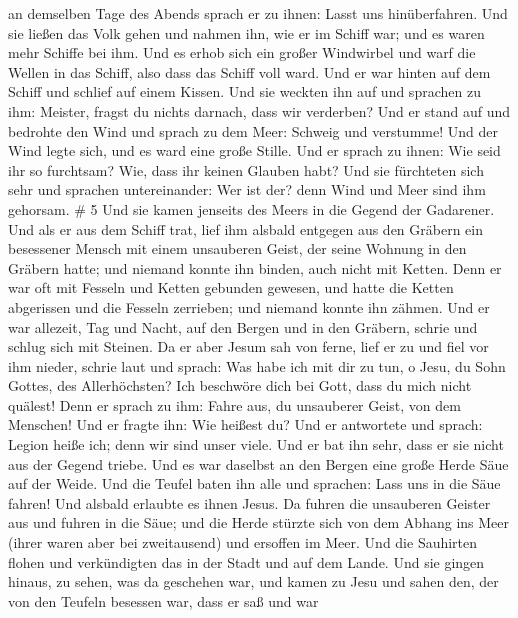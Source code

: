 an demselben Tage des Abends sprach er zu ihnen: Lasst uns
hinüberfahren.  Und sie ließen das Volk gehen und nahmen
ihn, wie er im Schiff war; und es waren mehr Schiffe bei ihm.
 Und es erhob sich ein großer Windwirbel und warf die
Wellen in das Schiff, also dass das Schiff voll ward.  Und
er war hinten auf dem Schiff und schlief auf einem Kissen. Und sie
weckten ihn auf und sprachen zu ihm: Meister, fragst du nichts darnach,
dass wir verderben?  Und er stand auf und bedrohte den Wind
und sprach zu dem Meer: Schweig und verstumme! Und der Wind legte sich,
und es ward eine große Stille.  Und er sprach zu ihnen: Wie
seid ihr so furchtsam? Wie, dass ihr keinen Glauben habt? 
Und sie fürchteten sich sehr und sprachen untereinander: Wer ist der?
denn Wind und Meer sind ihm gehorsam. \# 5  Und sie kamen
jenseits des Meers in die Gegend der Gadarener.  Und als er
aus dem Schiff trat, lief ihm alsbald entgegen aus den Gräbern ein
besessener Mensch mit einem unsauberen Geist,  der seine
Wohnung in den Gräbern hatte; und niemand konnte ihn binden, auch nicht
mit Ketten.  Denn er war oft mit Fesseln und Ketten gebunden
gewesen, und hatte die Ketten abgerissen und die Fesseln zerrieben; und
niemand konnte ihn zähmen.  Und er war allezeit, Tag und
Nacht, auf den Bergen und in den Gräbern, schrie und schlug sich mit
Steinen.  Da er aber Jesum sah von ferne, lief er zu und
fiel vor ihm nieder, schrie laut und sprach:  Was habe ich
mit dir zu tun, o Jesu, du Sohn Gottes, des Allerhöchsten? Ich beschwöre
dich bei Gott, dass du mich nicht quälest!  Denn er sprach
zu ihm: Fahre aus, du unsauberer Geist, von dem Menschen! 
Und er fragte ihn: Wie heißest du? Und er antwortete und sprach: Legion
heiße ich; denn wir sind unser viele.  Und er bat ihn sehr,
dass er sie nicht aus der Gegend triebe.  Und es war
daselbst an den Bergen eine große Herde Säue auf der Weide.
 Und die Teufel baten ihn alle und sprachen: Lass uns in
die Säue fahren!  Und alsbald erlaubte es ihnen Jesus. Da
fuhren die unsauberen Geister aus und fuhren in die Säue; und die Herde
stürzte sich von dem Abhang ins Meer (ihrer waren aber bei zweitausend)
und ersoffen im Meer.  Und die Sauhirten flohen und
verkündigten das in der Stadt und auf dem Lande. Und sie gingen hinaus,
zu sehen, was da geschehen war,  und kamen zu Jesu und
sahen den, der von den Teufeln besessen war, dass er saß und war

